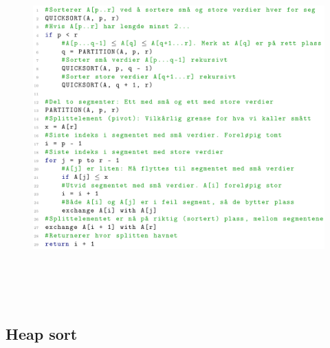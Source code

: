 \documentclass[12pt]{report}
\begin{document}
\begin{figure}[H]
	\begin{Center}
		\includegraphics[width=6.3in,height=5.25in]{./media/image169.png}
	\end{Center}
\end{figure}



\par


\vspace{\baselineskip}

\vspace{\baselineskip}

\vspace{\baselineskip}

\vspace{\baselineskip}

\vspace{\baselineskip}

\vspace{\baselineskip}\subsection*{Heap sort}
\end{document}
